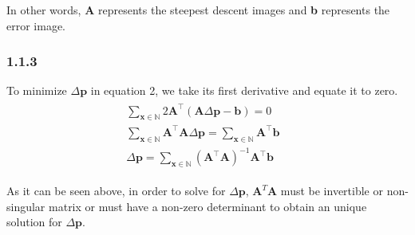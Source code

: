 \documentclass[a4paper]{article}
\begin{document}
In other words, \textbf{A} represents the steepest descent images and \textbf{b} represents the error image.

\subsubsection*{1.1.3}
To minimize $\Delta \mathbf { p }$ in equation 2, we take its first derivative and equate it to zero.
\begin{gather}
    \begin{array}{c}
    \sum _ { \mathbf { x } \in \mathbb { N } } 2\mathbf { A } ^ {\top} (\mathbf { A } \Delta \mathbf { p } - \mathbf { b }) = 0
    &  \\
    \sum _ { \mathbf { x } \in \mathbb { N } } \mathbf { A } ^ {\top} \mathbf { A } \Delta \mathbf { p } = \sum _ { \mathbf { x } \in \mathbb { N } } \mathbf { A } ^ {\top} \mathbf { b }
    &  \\ 
    \Delta \mathbf { p } = \sum _ { \mathbf { x } \in \mathbb { N } } (\mathbf { A } ^ {\top} \mathbf { A }) ^ {-1} \mathbf { A } ^ {\top} \mathbf { b }
    \end{array}
\end{gather}

As it can be seen above, in order to solve for $\Delta \mathbf { p }$, $\mathbf { A } ^ { T } \mathbf { A }$ must be invertible or non-singular matrix or must have a non-zero determinant to obtain an unique solution for $\Delta \mathbf { p }$.
\end{document}

